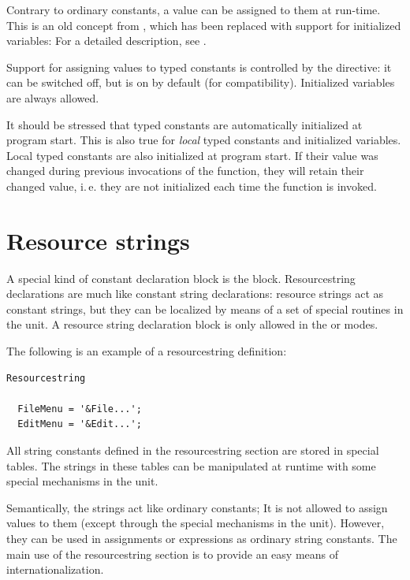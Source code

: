 Contrary to ordinary constants, a value can be assigned to them at
run-time.  This is an old concept from \tp, which has been
replaced with  support for initialized variables: For a detailed
description, see .

Support for assigning values to typed constants is controlled by the
 directive: it can be switched off, but is on by default
(for \tp compatibility). Initialized variables are always allowed.

\begin{remark}
It should be stressed that typed constants are automatically initialized at program start.
This is also true for \emph{local} typed constants and initialized variables.
Local typed constants are also initialized at program start. If their value was
changed during previous invocations of the function, they will retain their
changed value, i.\,e. they are not initialized each time the function is invoked.
\end{remark}


\section{Resource strings}
\label{se:resourcestring}
A special kind of constant declaration block is the 
block. Resourcestring declarations are much like constant string
declarations: resource strings act as constant strings, but they
can be localized by means of a set of special routines in the
 unit. A resource string declaration block
is only allowed in the  or  modes.

The following is an example of a resourcestring definition:
\begin{verbatim}
Resourcestring

  FileMenu = '&File...';
  EditMenu = '&Edit...';
\end{verbatim}
All string constants defined in the resourcestring section are stored
in special tables. The strings in these tables can be manipulated
at runtime with some special mechanisms in the  unit.

Semantically, the strings act like ordinary constants; It is not allowed
to assign values to them (except through the special mechanisms in the
 unit). However, they can be used in assignments or expressions as
ordinary string constants. The main use of the resourcestring section is
to provide an easy means of internationalization.

